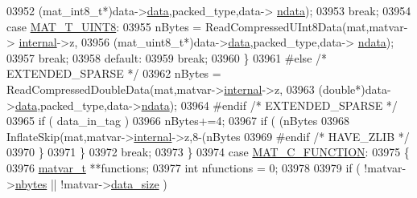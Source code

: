 \begin{DoxyCode}
{{{{{{{{{{{{{{{{{{{03952                                  (mat\_int8\_t*)data->\hyperlink{group___m_a_t_ae2c648cb9eac4ce47f26cddb44246152}{data},packed\_type,data->
      \hyperlink{group___m_a_t_a1beb8a8c58a808207cbea650563a9b63}{ndata});
03953                             \textcolor{keywordflow}{break};
03954                         \textcolor{keywordflow}{case} \hyperlink{group___m_a_t_ggacf7b3b879282b7ab3a51190e49bf3453a01c1bd7db68f90552862eb5d311be408}{MAT\_T\_UINT8}:
03955                             nBytes = ReadCompressedUInt8Data(mat,matvar->
      \hyperlink{group___m_a_t_a6e97e3ed9f40c49322c18561c2a94e92}{internal}->z,
03956                                  (mat\_uint8\_t*)data->\hyperlink{group___m_a_t_ae2c648cb9eac4ce47f26cddb44246152}{data},packed\_type,data->
      \hyperlink{group___m_a_t_a1beb8a8c58a808207cbea650563a9b63}{ndata});
03957                             \textcolor{keywordflow}{break};
03958                         \textcolor{keywordflow}{default}:
03959                             \textcolor{keywordflow}{break};
03960                     \}
03961 \textcolor{preprocessor}{#else   }\textcolor{comment}{/* EXTENDED\_SPARSE */}\textcolor{preprocessor}{}
03962                     nBytes = ReadCompressedDoubleData(mat,matvar->\hyperlink{group___m_a_t_a6e97e3ed9f40c49322c18561c2a94e92}{internal}->z,
03963                                  (\textcolor{keywordtype}{double}*)data->\hyperlink{group___m_a_t_ae2c648cb9eac4ce47f26cddb44246152}{data},packed\_type,data->\hyperlink{group___m_a_t_a1beb8a8c58a808207cbea650563a9b63}{ndata});
03964 \textcolor{preprocessor}{#endif   }\textcolor{comment}{/* EXTENDED\_SPARSE */}\textcolor{preprocessor}{}
03965                     \textcolor{keywordflow}{if} ( data\_in\_tag )
03966                         nBytes+=4;
03967                     \textcolor{keywordflow}{if} ( (nBytes %
03968                         InflateSkip(mat,matvar->\hyperlink{group___m_a_t_a6e97e3ed9f40c49322c18561c2a94e92}{internal}->z,8-(nBytes %
03969 \textcolor{preprocessor}{#endif   }\textcolor{comment}{/* HAVE\_ZLIB */}\textcolor{preprocessor}{}
03970                 \}
03971             \}
03972             \textcolor{keywordflow}{break};
03973         \}
03974         \textcolor{keywordflow}{case} \hyperlink{group___m_a_t_ggad4d60ae7b709fc81bfd744fb4c857c40aaa9bf08312779cd1ab8e504a162ddcea}{MAT\_C\_FUNCTION}:
03975         \{
03976             \hyperlink{group___m_a_t_structmatvar__t}{matvar\_t} **functions;
03977             \textcolor{keywordtype}{int} nfunctions = 0;
03978 
03979             \textcolor{keywordflow}{if} ( !matvar->\hyperlink{group___m_a_t_abf1c844540503be2df9bb3db93cfe307}{nbytes} || !matvar->\hyperlink{group___m_a_t_a9ad1c82e2b568da617e12dc73a26e1f9}{data\_size} )
}}}}}}}}}}}}}}}}}}}
\end{DoxyCode}
